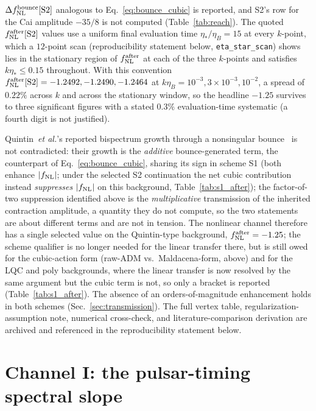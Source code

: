 \documentclass[aps,prd,twocolumn,superscriptaddress,nofootinbib,longbibliography]{revtex4-2}
\newcommand{\fnl}{f_{\rm NL}}
\begin{document}
$\Delta\fnl^{\rm bounce}[{\rm S2}]$ analogous to Eq.~\eqref{eq:bounce_cubic}
is reported, and S2's row for the Cai amplitude $-35/8$ is not computed
(Table~\ref{tab:reach}). The quoted $\fnl^{\rm after}[{\rm S2}]$ values use a uniform final
evaluation time $\eta_*/\eta_B=15$ at every $k$-point, which a $12$-point
scan (reproducibility statement below, \texttt{eta\_star\_scan}) shows
lies in the stationary region of $\fnl^{\rm after}$ at each of the three
$k$-points and satisfies $k\eta_*\le0.15$ throughout. With this
convention $\fnl^{\rm after}[{\rm S2}]=-1.2492,-1.2490,-1.2464$ at
$k\eta_B=10^{-3},3\times10^{-3},10^{-2}$, a spread of $0.22\%$ across $k$
and across the stationary window, so the headline $-1.25$ survives to
three significant figures with a stated $0.3\%$ evaluation-time
systematic (a fourth digit is not justified).

Quintin~\textit{et al.}'s reported bispectrum growth through a nonsingular
bounce~\cite{Quintin2015} is not contradicted: their growth is the
\emph{additive} bounce-generated term, the counterpart of
Eq.~\eqref{eq:bounce_cubic}, sharing its sign in scheme S1 (both enhance
$|\fnl|$; under the selected S2 continuation the net cubic contribution
instead \emph{suppresses} $|\fnl|$ on this background, Table~\ref{tab:s1_after}); the
factor-of-two suppression identified above is the \emph{multiplicative}
transmission of the inherited contraction amplitude, a quantity they do not
compute, so the two statements are about different terms and are not in
tension. The nonlinear channel therefore has a single selected value on
the Quintin-type background, $\fnl^{\rm after}=-1.25$; the scheme
qualifier is no longer needed for the linear transfer there, but is still
owed for the cubic-action form (raw-ADM vs.\ Maldacena-form, above) and
for the LQC and poly backgrounds, where the linear transfer is now
resolved by the same argument but the cubic term is not, so only a
bracket is reported (Table~\ref{tab:s1_after}). The absence of an orders-of-magnitude
enhancement holds in both schemes (Sec.~\ref{sec:transmission}).
The full vertex table, regularization-assumption note, numerical
cross-check, and literature-comparison derivation are archived and
referenced in the reproducibility statement below.

\section{Channel I: the pulsar-timing spectral slope}
\label{sec:pta}
\end{document}
